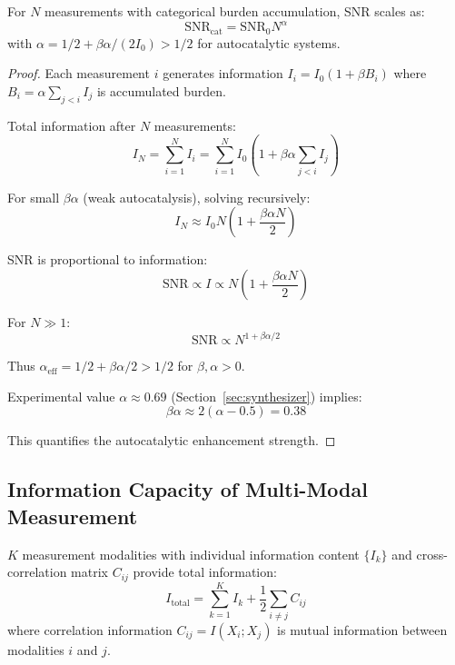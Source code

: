 \begin{theorem}
\label{thm:categorical_averaging}
For $N$ measurements with categorical burden accumulation, SNR scales as:
\begin{equation}
\text{SNR}_{\text{cat}} = \text{SNR}_0 N^{\alpha}
\end{equation}
with $\alpha = 1/2 + \beta\alpha/(2I_0) > 1/2$ for autocatalytic systems.
\end{theorem}

\begin{proof}
Each measurement $i$ generates information $I_i = I_0(1 + \beta B_i)$ where $B_i = \alpha \sum_{j<i} I_j$ is accumulated burden.

Total information after $N$ measurements:
\begin{equation}
I_N = \sum_{i=1}^{N} I_i = \sum_{i=1}^{N} I_0(1 + \beta\alpha\sum_{j<i} I_j)
\end{equation}

For small $\beta\alpha$ (weak autocatalysis), solving recursively:
\begin{equation}
I_N \approx I_0 N(1 + \frac{\beta\alpha N}{2})
\end{equation}

SNR is proportional to information:
\begin{equation}
\text{SNR} \propto I \propto N(1 + \frac{\beta\alpha N}{2})
\end{equation}

For $N \gg 1$:
\begin{equation}
\text{SNR} \propto N^{1 + \beta\alpha/2}
\end{equation}

Thus $\alpha_{\text{eff}} = 1/2 + \beta\alpha/2 > 1/2$ for $\beta, \alpha > 0$.

Experimental value $\alpha \approx 0.69$ (Section~\ref{sec:synthesizer}) implies:
\begin{equation}
\beta\alpha \approx 2(\alpha - 0.5) = 0.38
\end{equation}

This quantifies the autocatalytic enhancement strength.
\end{proof}

\subsection{Information Capacity of Multi-Modal Measurement}

\begin{theorem}
\label{thm:multimodal_capacity}
$K$ measurement modalities with individual information content $\{I_k\}$ and cross-correlation matrix $C_{ij}$ provide total information:
\begin{equation}
I_{\text{total}} = \sum_{k=1}^{K} I_k + \frac{1}{2}\sum_{i \neq j} C_{ij}
\end{equation}
where correlation information $C_{ij} = I(X_i; X_j)$ is mutual information between modalities $i$ and $j$.
\end{theorem}

